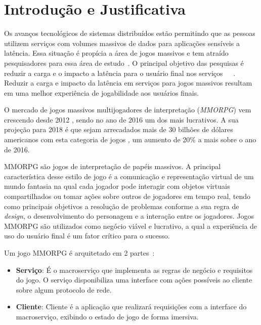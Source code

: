 \section{Introdução e Justificativa}
\label{sec:int}

Os avanços tecnológicos de sistemas distribuídos estão permitindo que as pessoas utilizem serviços com volumes massivos de dados para aplicações sensíveis a latência.
%
Essa situação é propícia a área de jogos massivos e tem atraído pesquisadores para essa área de estudo~\cite{mmo_analytic}.
%
O principal objetivo das pesquisas é reduzir a carga e o impacto a latência para o usuário final nos serviços~\cite{1417630}~\cite{6267019}~\cite{6063041}.
%
Reduzir a carga e impacto da latência em serviços para jogos massivos resultam em uma melhor experiência de jogabilidade aos usuários finais\cite{1417630}.



O mercado de jogos massivos multijogadores de interpretação (\textit{MMORPG}) vem crescendo desde 2012 \cite{new_york_times}, sendo no ano de 2016 um dos mais lucrativos\cite{statista_2016}. %
%
A sua projeção para 2018 é que sejam arrecadados mais de 30 bilhões de dólares americanos com esta categoria de jogos \cite{statista_2018}, um aumento de 20\% a mais sobre o ano de 2016.



\ac{MMORPG} são jogos de interpretação de papéis massivos.
%
A principal característica desse estilo de jogo é a comunicação e representação virtual de um mundo fantasia na qual cada jogador pode interagir com objetos virtuais compartilhados ou tomar ações sobre outros de jogadores em tempo real, tendo como principais objetivos a resolução de problemas conforme a sua regra de \textit{design}, o desenvolvimento do personagem e a interação entre os jogadores\cite{video_game_technologies}.
%
Jogos \ac{MMORPG} são utilizados como negócio viável e lucrativo, a qual a experiência de uso do usuário final é um fator crítico para o sucesso.

Um jogo \ac{MMORPG} é arquitetado em 2 partes~\cite{mmo_analytic}:
\begin{itemize}
  \item \textbf{Serviço}: É o macroserviço que implementa as regras de negócio e requisitos do jogo.
  O serviço disponibiliza uma interface com ações possíveis ao cliente sobre algum protocolo de rede.
  \item \textbf{Cliente}: Cliente é a aplicação que realizará requisições com a interface do macroserviço, exibindo o estado de jogo de forma imersiva.
\end{itemize}

